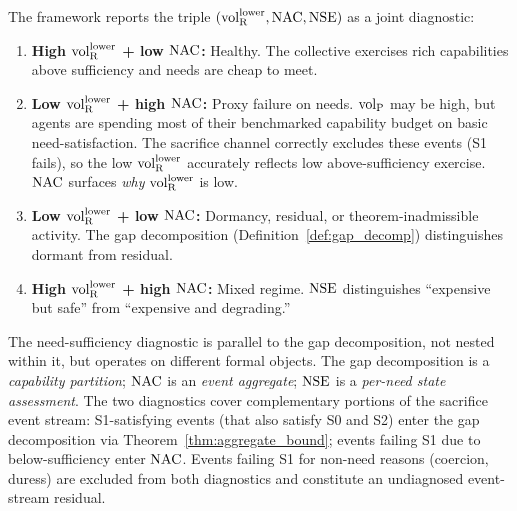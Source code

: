\begin{proposition}
\label{prop:combined_diagnostic}
The framework reports the triple $({\operatorname{vol}_{\mathrm{R}}^{\mathrm{lower}}}, \mathrm{NAC}, \mathrm{NSE})$ as a
joint diagnostic:
\begin{enumerate}
\item[(a)] \textbf{High ${\operatorname{vol}_{\mathrm{R}}^{\mathrm{lower}}}$ + low $\mathrm{NAC}$:} Healthy.
  The collective exercises rich capabilities above sufficiency
  and needs are cheap to meet.
\item[(b)] \textbf{Low ${\operatorname{vol}_{\mathrm{R}}^{\mathrm{lower}}}$ + high $\mathrm{NAC}$:} Proxy
  failure on needs.  ${\operatorname{vol}_{\mathrm{P}}}$ may be high, but agents are
  spending most of their benchmarked capability budget on basic
  need-satisfaction.  The sacrifice channel correctly excludes
  these events (S1 fails), so the low ${\operatorname{vol}_{\mathrm{R}}^{\mathrm{lower}}}$ accurately
  reflects low above-sufficiency exercise.  $\mathrm{NAC}$ surfaces
  \emph{why} ${\operatorname{vol}_{\mathrm{R}}^{\mathrm{lower}}}$ is low.
\item[(c)] \textbf{Low ${\operatorname{vol}_{\mathrm{R}}^{\mathrm{lower}}}$ + low $\mathrm{NAC}$:} Dormancy,
  residual, or theorem-inadmissible activity.  The gap
  decomposition (Definition~\ref{def:gap_decomp}) distinguishes
  dormant from residual.
\item[(d)] \textbf{High ${\operatorname{vol}_{\mathrm{R}}^{\mathrm{lower}}}$ + high $\mathrm{NAC}$:} Mixed
  regime.  $\mathrm{NSE}$ distinguishes ``expensive but safe'' from
  ``expensive and degrading.''
\end{enumerate}
\end{proposition}

\begin{remark}
The need-sufficiency diagnostic is parallel to the gap
decomposition, not nested within it, but operates on different
formal objects.  The gap decomposition is a \emph{capability
partition}; $\mathrm{NAC}$ is an \emph{event aggregate}; $\mathrm{NSE}$ is a
\emph{per-need state assessment}.  The two diagnostics cover
complementary portions of the sacrifice event stream:
S1-satisfying events (that also satisfy S0 and S2) enter the gap
decomposition via Theorem~\ref{thm:aggregate_bound}; events
failing S1 due to below-sufficiency enter $\mathrm{NAC}$.  Events failing
S1 for non-need reasons (coercion, duress) are excluded from
both diagnostics and constitute an undiagnosed event-stream
residual.
\end{remark}
